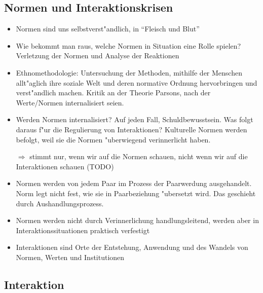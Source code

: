 \documentclass[a4paper, 12pt]{scrartcl}
\begin{document}
\subsection{Normen und Interaktionskrisen}
\begin{itemize}
	\item
		Normen sind uns selbstverst"andlich, in \enquote{Fleisch und Blut}
	\item
		Wie bekommt man raus, welche Normen in Situation eine Rolle spielen? Verletzung der Normen und Analyse der Reaktionen
	\item
		Ethnomethodologie: Untersuchung der Methoden, mithilfe der Menschen allt"aglich ihre soziale Welt und deren normative Ordnung hervorbringen und verst"andlich machen. Kritik an der Theorie Parsons, nach der Werte/Normen internalisiert seien.
	\item
		Werden Normen internalisiert? Auf jeden Fall, Schuldbewusstsein. Was folgt daraus f"ur die Regulierung von Interaktionen? Kulturelle Normen werden befolgt, weil sie die Normen "uberwiegend verinnerlicht haben.

		$\Rightarrow$ stimmt nur, wenn wir auf die Normen schauen, nicht wenn wir auf die Interaktionen schauen (TODO)
	\item
		Normen werden von jedem Paar im Prozess der Paarwerdung ausgehandelt. Norm legt nicht fest, wie sie in Paarbeziehung "ubersetzt wird. Das geschieht durch Aushandlungsprozess.
	\item
		Normen werden nicht durch Verinnerlichung handlungsleitend, werden aber in Interaktionssituationen praktisch verfestigt
	\item
		Interaktionen sind Orte der Entstehung, Anwendung und des Wandels von Normen, Werten und Institutionen
\end{itemize}

\subsection{Interaktion}
\end{document}
